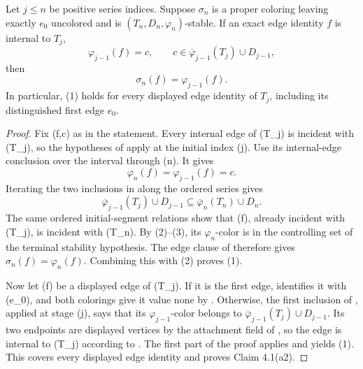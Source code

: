 \begin{lemma}
Let \(j\leq n\) be positive series indices.  Suppose \(\sigma_n\) is a
proper coloring leaving exactly \(e_0\) uncolored and is
\((T_n,D_n,\varphi_n)\)-stable.  If an exact edge identity \(f\) is
internal to \(T_j\),
\[
 \varphi_{j-1}(f)=c,
 \qquad c\in\overline\varphi_{j-1}(T_j)\cup D_{j-1},
\]
then
\[
                         \sigma_n(f)=\varphi_{j-1}(f).          \tag{1}
\]
In particular, (1) holds for every displayed edge identity of \(T_j\),
including its distinguished first edge \(e_0\).
\end{lemma}
\begin{proof}
Fix (f,c) as in the statement.  Every internal edge of (T_j) is
incident with (T_j), so the hypotheses of
 apply at the initial index (j).  Use
its internal-edge conclusion over the interval through (n).  It gives
\[
                         \varphi_n(f)=\varphi_{j-1}(f)=c.       \tag{2}
\]
Iterating the two inclusions in
 along the ordered series gives
\[
 \overline\varphi_{j-1}(T_j)\cup D_{j-1}
 \subseteq \overline\varphi_n(T_n)\cup D_n.                    \tag{3}
\]
The same ordered initial-segment relations show that (f), already
incident with (T_j), is incident with (T_n).  By (2)--(3), its
\(\varphi_n\)-color is in the controlling set of the terminal stability
hypothesis.  The edge clause of  therefore gives
\(\sigma_n(f)=\varphi_n(f)\).  Combining this with (2) proves (1).

Now let (f) be a displayed edge of (T_j).  If it is the first edge,
 identifies it with (e_0), and both colorings give
it value \(\mathrm{none}\) by .  Otherwise,
the first inclusion of , applied at
stage (j), says that its \(\varphi_{j-1}\)-color belongs to
\(\overline\varphi_{j-1}(T_j)\cup D_{j-1}\).  Its two endpoints are
displayed vertices by the attachment field of , so
the edge is internal to (T_j) according to .
The first part of the proof applies and yields (1).  This covers every
displayed edge identity and proves Claim 4.1(a2).
\end{proof}
